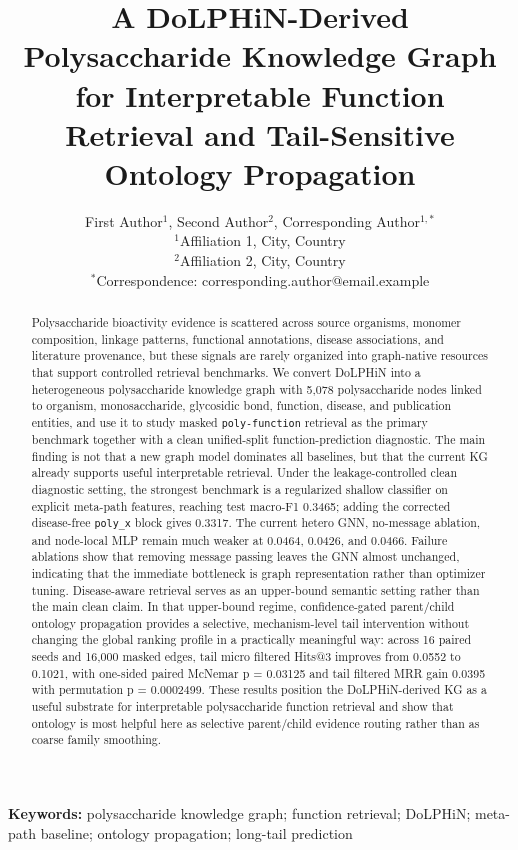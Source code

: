 \documentclass[11pt]{article}
\title{A DoLPHiN-Derived Polysaccharide Knowledge Graph for Interpretable Function Retrieval and Tail-Sensitive Ontology Propagation}
\author{First Author$^{1}$, Second Author$^{2}$, Corresponding Author$^{1,*}$\\
\small $^{1}$Affiliation 1, City, Country\\
\small $^{2}$Affiliation 2, City, Country\\
\small $^{*}$Correspondence: corresponding.author@email.example}
\date{}
\begin{document}
\maketitle

\begin{abstract}
Polysaccharide bioactivity evidence is scattered across source organisms, monomer composition, linkage patterns, functional annotations, disease associations, and literature provenance, but these signals are rarely organized into graph-native resources that support controlled retrieval benchmarks. We convert DoLPHiN into a heterogeneous polysaccharide knowledge graph with 5,078 polysaccharide nodes linked to organism, monosaccharide, glycosidic bond, function, disease, and publication entities, and use it to study masked \texttt{poly-function} retrieval as the primary benchmark together with a clean unified-split function-prediction diagnostic. The main finding is not that a new graph model dominates all baselines, but that the current KG already supports useful interpretable retrieval. Under the leakage-controlled clean diagnostic setting, the strongest benchmark is a regularized shallow classifier on explicit meta-path features, reaching test macro-F1 0.3465; adding the corrected disease-free \texttt{poly\_x} block gives 0.3317. The current hetero GNN, no-message ablation, and node-local MLP remain much weaker at 0.0464, 0.0426, and 0.0466. Failure ablations show that removing message passing leaves the GNN almost unchanged, indicating that the immediate bottleneck is graph representation rather than optimizer tuning. Disease-aware retrieval serves as an upper-bound semantic setting rather than the main clean claim. In that upper-bound regime, confidence-gated parent/child ontology propagation provides a selective, mechanism-level tail intervention without changing the global ranking profile in a practically meaningful way: across 16 paired seeds and 16,000 masked edges, tail micro filtered Hits@3 improves from 0.0552 to 0.1021, with one-sided paired McNemar p = 0.03125 and tail filtered MRR gain 0.0395 with permutation p = 0.0002499. These results position the DoLPHiN-derived KG as a useful substrate for interpretable polysaccharide function retrieval and show that ontology is most helpful here as selective parent/child evidence routing rather than as coarse family smoothing.
\end{abstract}

\noindent\textbf{Keywords:} polysaccharide knowledge graph; function retrieval; DoLPHiN; meta-path baseline; ontology propagation; long-tail prediction
\end{document}
